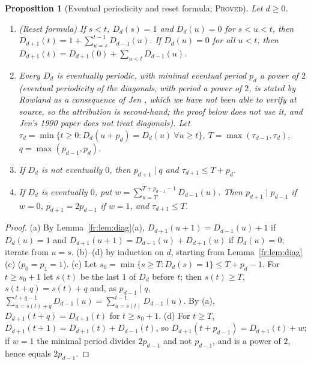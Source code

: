 \documentclass[11pt]{article}
\newtheorem{proposition}[theorem]{Proposition}
\theoremstyle{definition}
\theoremstyle{remark}
\newcommand{\PROVED}{\textsc{Proved}}
\begin{document}
\begin{proposition}[Eventual periodicity and reset formula; \PROVED]\label{fr:prop:period}
Let $d\ge0$.
\begin{enumerate}
\item[(a)] (Reset formula) If $s<t$, $D_d(s)=1$ and $D_d(u)=0$ for $s<u<t$, then
$D_{d+1}(t)=1+\sum_{u=s}^{t-1}D_{d-1}(u)$. If $D_d(u)=0$ for all $u<t$, then
$D_{d+1}(t)=D_{d+1}(0)+\sum_{u<t}D_{d-1}(u)$.
\item[(b)] Every $D_d$ is eventually periodic, with minimal eventual period $p_d$ a power of $2$
(eventual periodicity of the diagonals, with period a power of $2$, is stated by Rowland \cite[\S5]{Rowland} as a consequence of Jen \cite[Thm.~4]{Jen86}, which we have not been able to verify at source, so the attribution is second-hand; the proof below does not use it, and Jen's 1990 paper does not treat diagonals).
Let $\tau_d=\min\{t\ge0: D_d(u+p_d)=D_d(u)\ \forall u\ge t\}$, $T=\max(\tau_{d-1},\tau_d)$,
$q=\max(p_{d-1},p_d)$.
\item[(c)] If $D_d$ is not eventually $0$, then $p_{d+1}\mid q$ and $\tau_{d+1}\le T+p_d$.
\item[(d)] If $D_d$ is eventually $0$, put $w=\sum_{u=T}^{T+p_{d-1}-1}D_{d-1}(u)$. Then
$p_{d+1}\mid p_{d-1}$ if $w=0$, $p_{d+1}=2p_{d-1}$ if $w=1$, and $\tau_{d+1}\le T$.
\end{enumerate}
\end{proposition}
\begin{proof}
(a) By Lemma~\ref{fr:lem:diag}(a), $D_{d+1}(u+1)=D_{d-1}(u)+1$ if $D_d(u)=1$ and
$D_{d+1}(u+1)=D_{d-1}(u)+D_{d+1}(u)$ if $D_d(u)=0$; iterate from $u=s$.
(b)--(d) by induction on $d$, starting from Lemma~\ref{fr:lem:diag}(c) ($p_0=p_1=1$).
(c) Let $s_0=\min\{s\ge T:D_d(s)=1\}\le T+p_d-1$. For $t\ge s_0+1$ let $s(t)$ be the last
$1$ of $D_d$ before $t$; then $s(t)\ge T$, $s(t+q)=s(t)+q$ and, as $p_{d-1}\mid q$,
$\sum_{u=s(t)+q}^{t+q-1}D_{d-1}(u)=\sum_{u=s(t)}^{t-1}D_{d-1}(u)$. By (a),
$D_{d+1}(t+q)=D_{d+1}(t)$ for $t\ge s_0+1$.
(d) For $t\ge T$, $D_{d+1}(t+1)=D_{d+1}(t)+D_{d-1}(t)$, so
$D_{d+1}(t+p_{d-1})=D_{d+1}(t)+w$; if $w=1$ the minimal period divides $2p_{d-1}$ and not
$p_{d-1}$, and is a power of $2$, hence equals $2p_{d-1}$.
\end{proof}
\end{document}
